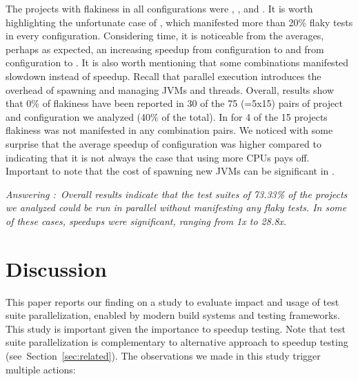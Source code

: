 \documentclass[10pt,journal,compsoc]{IEEEtran}
\begin{document}
The projects with flakiness
in all configurations were , , and
.  It is worth highlighting the unfortunate case of
, which manifested more than 20\% flaky tests in
every configuration.  Considering time, it is noticeable from the
averages, perhaps as expected, an increasing speedup from
configuration \emph{\SeqClassParMeth} to \emph{\ParClassParMeth} and
from configuration \emph{\ForkSeq} to \emph{\ForkParMeth}.  It is also
worth mentioning that some combinations manifested slowdown instead of
speedup.  Recall that parallel execution introduces the overhead of
spawning and managing JVMs and threads.  Overall, results show that
0\% of flakiness have been reported in 30 of the 75 (=5x15)
pairs of project and configuration we analyzed (40\% of the total).
In for 4 of the 15 projects flakiness was not manifested in 
any combination pairs.  We noticed with some surprise that the average speedup of
configuration \emph{\SeqClassParMeth} was higher compared to
\emph{\ForkParMeth} indicating that it is not always the case that
using more CPUs pays off. Important to note that the cost of spawning
new JVMs can be significant in \emph{\ForkParMeth}.

\begin{mdframed}
\noindent\textit{Answering \numRQIssuesOne{}:~Overall results indicate that the
  test suites of 73.33\% of the projects we analyzed could be run in
  parallel without manifesting any flaky tests.  In some of these
  cases, speedups were significant, ranging from 1x to 28.8x.}
\end{mdframed}


\section{Discussion}

This paper reports our finding on a study to evaluate impact and usage
of test suite parallelization, enabled by modern build systems and
testing frameworks.  This study is important given the importance to
speedup testing.  Note that test suite parallelization is
complementary to alternative approach to speedup testing
(see~Section~\ref{sec:related}).  The observations we made in this
study trigger multiple actions:
\end{document}
